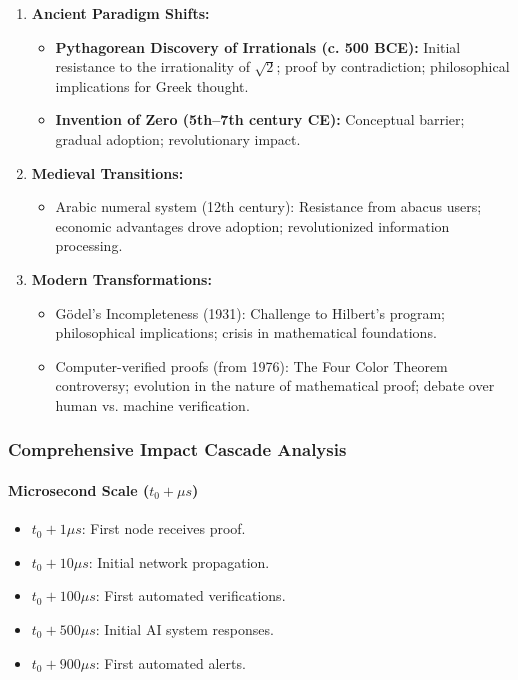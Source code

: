 \documentclass[11pt]{article}
\begin{document}
\begin{enumerate}[label=(\arabic*)]
    \item \textbf{Ancient Paradigm Shifts:}
    \begin{itemize}
        \item \textbf{Pythagorean Discovery of Irrationals (c. 500 BCE):} Initial resistance to the irrationality of $\sqrt{2}$; proof by contradiction; philosophical implications for Greek thought.
        \item \textbf{Invention of Zero (5th--7th century CE):} Conceptual barrier; gradual adoption; revolutionary impact.
    \end{itemize}
    \item \textbf{Medieval Transitions:}
    \begin{itemize}
        \item Arabic numeral system (12th century): Resistance from abacus users; economic advantages drove adoption; revolutionized information processing.
    \end{itemize}
    \item \textbf{Modern Transformations:}
    \begin{itemize}
        \item Gödel's Incompleteness (1931): Challenge to Hilbert's program; philosophical implications; crisis in mathematical foundations.
        \item Computer-verified proofs (from 1976): The Four Color Theorem controversy; evolution in the nature of mathematical proof; debate over human vs. machine verification.
    \end{itemize}
\end{enumerate}

\subsubsection{Comprehensive Impact Cascade Analysis}

\paragraph{Microsecond Scale \quad ($t_0+\mu s$)}
\begin{itemize}
    \item $t_0+1\mu s$: First node receives proof.
    \item $t_0+10\mu s$: Initial network propagation.
    \item $t_0+100\mu s$: First automated verifications.
    \item $t_0+500\mu s$: Initial AI system responses.
    \item $t_0+900\mu s$: First automated alerts.
\end{itemize}
\end{document}
